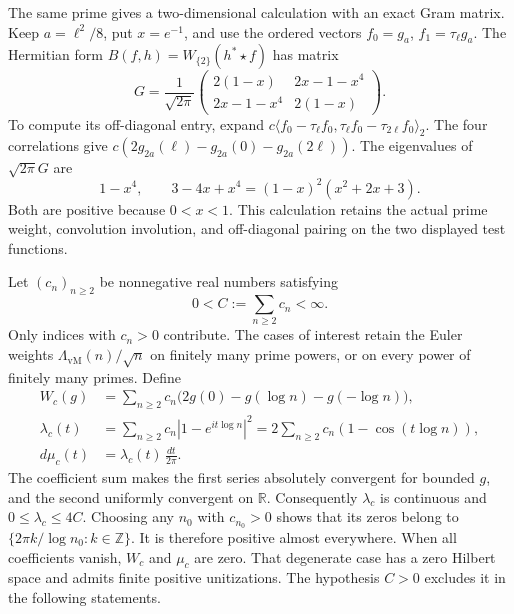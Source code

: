 \documentclass[11pt]{article}
\theoremstyle{definition}
\theoremstyle{remark}
\numberwithin{equation}{section}
\newcommand{\R}{\mathbb R}
\newcommand{\Z}{\mathbb Z}
\begin{document}
The same prime gives a two-dimensional calculation with an exact Gram
matrix.  Keep $a=\ell^2/8$, put $x=e^{-1}$, and use the ordered vectors
$f_0=g_a$, $f_1=\tau_\ell g_a$.
The Hermitian form $B(f,h)=W_{\{2\}}(h^*\star f)$ has matrix
\begin{equation}
 G=\frac1{\sqrt{2\pi}}
 \begin{pmatrix}
 2(1-x)&2x-1-x^4\\
 2x-1-x^4&2(1-x)
 \end{pmatrix}.
 \label{eq:wp-two-vector-gram}
\end{equation}
To compute its off-diagonal entry, expand
$c\langle f_0-\tau_\ell f_0,
\tau_\ell f_0-\tau_{2\ell}f_0\rangle_2$.
The four correlations give
$c(2g_{2a}(\ell)-g_{2a}(0)-g_{2a}(2\ell))$.
The eigenvalues of $\sqrt{2\pi}G$ are
\[
 1-x^4,\qquad 3-4x+x^4=(1-x)^2(x^2+2x+3).
\]
Both are positive because $0<x<1$.
This calculation retains the actual prime weight, convolution involution,
and off-diagonal pairing on the two displayed test functions.

Let $(c_n)_{n\geq2}$ be nonnegative real numbers satisfying
\[
 0<C:=\sum_{n\geq2}c_n<\infty.
\]
Only indices with $c_n>0$ contribute.
The cases of interest retain the Euler weights
$\Lambda_{\mathrm{vM}}(n)/\sqrt n$ on finitely many prime powers,
or on every power of finitely many primes.
Define
\begin{equation}
 \begin{aligned}
 W_c(g)&=\sum_{n\geq2}c_n
       \bigl(2g(0)-g(\log n)-g(-\log n)\bigr),\\
 \lambda_c(t)&=\sum_{n\geq2}c_n|1-e^{it\log n}|^2
       =2\sum_{n\geq2}c_n(1-\cos(t\log n)),\\
 d\mu_c(t)&=\lambda_c(t)\,\frac{dt}{2\pi}.
 \end{aligned}
 \label{eq:wp-positive-density}
\end{equation}
The coefficient sum makes the first series absolutely convergent for
bounded $g$, and the second uniformly convergent on $\R$.
Consequently $\lambda_c$ is continuous and $0\leq\lambda_c\leq4C$.
Choosing any $n_0$ with $c_{n_0}>0$ shows that its zeros belong to
$\{2\pi k/\log n_0:k\in\Z\}$.
It is therefore positive almost everywhere.
When all coefficients vanish, $W_c$ and $\mu_c$ are zero.
That degenerate case has a zero Hilbert space and admits finite positive
unitizations.  The hypothesis $C>0$ excludes it in the following statements.
\end{document}
